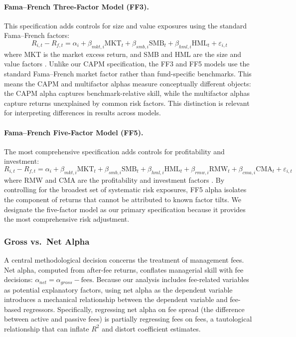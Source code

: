 \documentclass[11pt, a4paper]{article}
\begin{document}
\paragraph{Fama--French Three-Factor Model (FF3).} This specification adds controls for size and value exposures using the standard Fama--French factors:
\begin{equation}
    R_{i,t} - R_{f,t} = \alpha_{i} + \beta_{mkt,i}\text{MKT}_t + \beta_{smb,i}\text{SMB}_t + \beta_{hml,i}\text{HML}_t + \varepsilon_{i,t}
    \label{eq:ff3}
\end{equation}
where MKT is the market excess return, and SMB and HML are the size and value factors \parencite{fama1993}. Unlike our CAPM specification, the FF3 and FF5 models use the standard Fama--French market factor rather than fund-specific benchmarks. This means the CAPM and multifactor alphas measure conceptually different objects: the CAPM alpha captures benchmark-relative skill, while the multifactor alphas capture returns unexplained by common risk factors. This distinction is relevant for interpreting differences in results across models.

\paragraph{Fama--French Five-Factor Model (FF5).} The most comprehensive specification adds controls for profitability and investment:
\begin{equation}
    R_{i,t} - R_{f,t} = \alpha_{i} + \beta_{mkt,i}\text{MKT}_t + \beta_{smb,i}\text{SMB}_t + \beta_{hml,i}\text{HML}_t + \beta_{rmw,i}\text{RMW}_t + \beta_{cma,i}\text{CMA}_t + \varepsilon_{i,t}
    \label{eq:ff5}
\end{equation}
where RMW and CMA are the profitability and investment factors \parencite{fama2015}. By controlling for the broadest set of systematic risk exposures, FF5 alpha isolates the component of returns that cannot be attributed to known factor tilts. We designate the five-factor model as our primary specification because it provides the most comprehensive risk adjustment.

\subsubsection{Gross vs.\ Net Alpha}
\label{subsub:gross_net}

A central methodological decision concerns the treatment of management fees. Net alpha, computed from after-fee returns, conflates managerial skill with fee decisions: $\alpha_{net} = \alpha_{gross} - \text{fees}$. Because our analysis includes fee-related variables as potential explanatory factors, using net alpha as the dependent variable introduces a mechanical relationship between the dependent variable and fee-based regressors. Specifically, regressing net alpha on fee spread (the difference between active and passive fees) is partially regressing fees on fees, a tautological relationship that can inflate $R^2$ and distort coefficient estimates.
\end{document}
